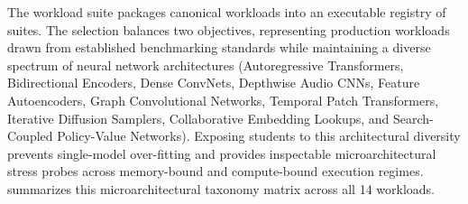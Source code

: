 \documentclass[10pt,twocolumn]{article}
\begin{document}
The workload suite packages \RegistryRows{} canonical workloads into an executable registry of \RegistrySuites{} suites. The selection balances two objectives, representing production workloads drawn from established benchmarking standards while maintaining a diverse spectrum of neural network architectures (Autoregressive Transformers, Bidirectional Encoders, Dense ConvNets, Depthwise Audio CNNs, Feature Autoencoders, Graph Convolutional Networks, Temporal Patch Transformers, Iterative Diffusion Samplers, Collaborative Embedding Lookups, and Search-Coupled Policy-Value Networks). Exposing students to this architectural diversity prevents single-model over-fitting and provides inspectable microarchitectural stress probes across memory-bound and compute-bound execution regimes.  summarizes this microarchitectural taxonomy matrix across all 14 workloads.
\end{document}
